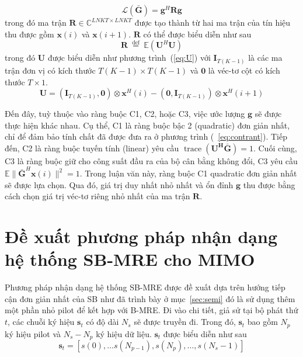 \begin{equation}
\label{eq:loss_mre}
    \mathcal{L}(\bar{\mathbf{G}})=\mathbf{g}^H \mathbf{R} \mathbf{g}
\end{equation}
trong đó ma trận $\mathbf{R} \in \mathbb{C}^{LNKT \times LNKT}$ được tạo thành từ hai ma trận của tín hiệu thu được gồm $\mathbf{x}(i)$ và $\mathbf{x}(i+1)$. $\mathbf{R}$ có thể được biểu diễn như sau
\begin{equation}
\label{eq:R}
\mathbf{R} \stackrel{\text { def }}{=} \mathbb{E}\left(\mathbf{U}^{H} \mathbf{U}\right)
\end{equation}
trong đó $\mathbf{U}$ được biểu diễn như phương trình~(\ref{eq:U}) với $\mathbf{I}_{T (K-1)}$ là các ma trận đơn vị có kích thước $T(K-1) \times T(K-1)$ và $\mathbf{0}$ là véc-tơ cột có kích thước $T \times 1$.
\begin{equation}
\label{eq:U}
\mathbf{U} = \left(\mathbf{I}_{T (K-1)}, \mathbf{0}\right) \otimes \mathbf{x}^{H}(i)-\left(\mathbf{0}, \mathbf{I}_{T (K-1)}\right) \otimes \mathbf{x}^{H}(i+1)
\end{equation}

Đến đây, tuỳ thuộc vào ràng buộc C1, C2, hoặc C3, việc ước lượng $\mathbf{g}$ sẽ được thực hiện khác nhau. Cụ thể, C1 là ràng buộc bậc 2 (quadratic) đơn giản nhất, chỉ để đảm bảo tính chất đã được đưa ra ở phương trình (~\ref{eq:contrant}). Tiếp đến, C2 là ràng buộc tuyến tính (linear) yêu cầu $\operatorname{trace}(\mathbf{U^H \mathbf{\bar{G}}}) = 1$. Cuối cùng, C3 là ràng buộc giữ cho công suất đầu ra của bộ cân bằng không đổi, C3 yêu cầu $\mathbb{E}\| \mathbf{\bar{G}}^H \mathbf{x}(i) \|^2 = 1$. Trong luận văn này, ràng buộc C1 quadratic đơn giản nhất sẽ được lựa chọn. Qua đó, giá trị duy nhất nhỏ nhất và ổn đỉnh $\mathbf{g}$ thu được bằng cách chọn giá trị véc-tơ riêng nhỏ nhất của ma trận $\mathbf{R}$.

\section{Đề xuất phương pháp nhận dạng hệ thống SB-MRE cho MIMO}

Phương pháp nhận dạng hệ thống SB-MRE được đề xuất dựa trên hướng tiếp cận đơn giản nhất của SB như đã trình bày ở mục~\ref{sec:semi} đó là sử dụng thêm một phần nhỏ pilot để kết hợp với B-MRE. Đi vào chi tiết, giả sử tại bộ phát thứ $t$, các chuỗi ký hiệu $\mathbf{s}_t$ có độ dài $N_s$ sẽ được truyền đi. Trong đó, $\mathbf{s}_t$ bao gồm $N_p$ ký hiệu pilot và $N_s - N_p$ ký hiệu dữ liệu. $\mathbf{s}_t$ được biểu diễn như sau
\begin{equation}
\mathbf{s}_t = \left[s(0), \ldots s\left(N_{p-1}\right), s\left(N_p\right), \ldots, s\left(N_s-1\right)\right]
\end{equation}

